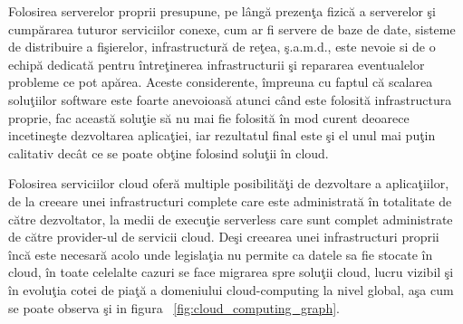 \documentclass[a4paper,12pt]{report}
\begin{document}
Folosirea serverelor proprii presupune, pe lângă prezenţa fizică a serverelor şi cumpărarea tuturor serviciilor conexe, cum ar fi servere de baze de date, sisteme de distribuire a fişierelor, infrastructură de reţea, ş.a.m.d., este nevoie si de o echipă dedicată pentru întreţinerea infrastructurii şi repararea eventualelor probleme ce pot apărea. Aceste considerente, împreuna cu faptul că scalarea soluţiilor software este foarte anevoioasă atunci când este folosită infrastructura proprie, fac această soluţie să nu mai fie folosită în mod curent deoarece incetineşte dezvoltarea aplicaţiei, iar rezultatul final este şi el unul mai puţin calitativ decât ce se poate obţine folosind soluţii în cloud. 
\par
Folosirea serviciilor cloud oferă multiple posibilităţi de dezvoltare a aplicaţiilor, de la creeare unei infrastructuri complete care este administrată în totalitate de către dezvoltator, la medii de execuţie serverless care sunt complet administrate de către provider-ul de servicii cloud. 
Deşi creearea unei infrastructuri proprii încă este necesară acolo unde legislaţia nu permite ca datele sa fie stocate în cloud, în toate celelalte cazuri se face migrarea spre soluţii cloud, lucru vizibil şi în evoluţia cotei de piaţă a domeniului cloud-computing la nivel global, aşa cum se poate observa şi in figura ~\ref{fig:cloud_computing_graph}. 
\end{document}
